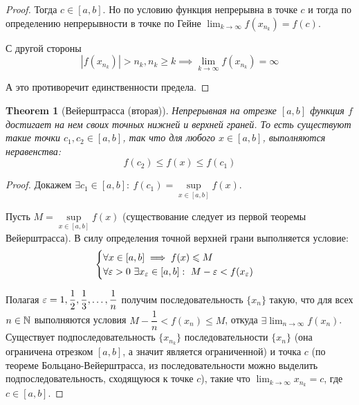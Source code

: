 \documentclass[a4paper]{article}
\theoremstyle{named}
\newtheorem*{namedtheorem}{Theorem}
\begin{document}
\begin{colloq}
\begin{proof}
			Тогда $c \in [a, b]$. Но по условию функция непрерывна в точке $c$ и тогда по определению непрерывности в точке по Гейне $\lim_{k \to \infty} f(x_{n_k}) = f(c)$.

			С другой стороны
			\begin{equation*}
				|f(x_{n_k})| > n_k, n_k \geq k \implies \lim_{k \to \infty} f(x_{n_k}) = \infty
			\end{equation*}

			А это противоречит единственности предела.
		\end{proof}

		\begin{namedtheorem}[Вейерштрасса (вторая)]
			Непрерывная на отрезке $[a, b]$ функция $f$ достигает на нем своих точных нижней и верхней граней. То есть существуют такие точки $c_1, c_2 \in [a, b]$, так что для любого $x \in [a, b]$, выполняются неравенства:
			\begin{equation*}
				f(c_2) \leq f(x) \leq f(c_1)
			\end{equation*}
		\end{namedtheorem}

		\begin{proof}
			Докажем $\exists c_1 \in [a, b]: \ f(c_1) = \sup\limits_{x \in [a, b]} f(x)$.

			Пусть $M = \sup\limits_{x \in [a, b]} f(x)$ (существование следует из первой теоремы Вейерштрасса). В силу определения точной верхней грани выполняется условие:
			\begin{equation*}
				\begin{cases}
					\forall x \in [a, b] \implies f(x) \leq M \\
					\forall \eps > 0 \ \exists x_{\eps} \in [a, b]: \ M - \eps < f(x_{\eps}) \\
				\end{cases}
			\end{equation*}

			Полагая $\varepsilon = 1, \dfrac{1}{2}, \dfrac{1}{3}, \dots, \dfrac{1}{n}$ получим последовательность $\{x_n\}$ такую, что для всех $n \in \mathbb{N}$ выполняются условия $M - \dfrac{1}{n} < f(x_n) \leq M$, откуда $\exists \lim_{n \to \infty} f(x_n)$. Существует подпоследовательность $\{x_{n_k}\}$ последовательности $\{x_n\}$ (она ограничена отрезком $[a, b]$, а значит является ограниченной) и точка $c$ (по теореме Больцано-Вейерштрасса, из последовательности можно выделить подпоследовательность, сходящуюся к точке $c$), такие что $\lim_{k \to \infty} x_{n_k} = c$, где $c \in [a, b]$.


\end{proof}
\end{colloq}
\end{document}
